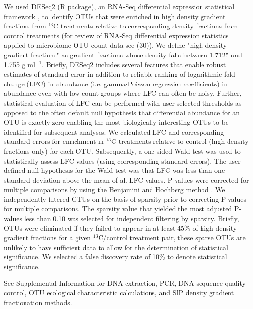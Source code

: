We used DESeq2 (R package), an RNA-Seq differential expression statistical
framework \citep{love2014}, to identify OTUs that were enriched in high
density gradient fractions from $^{13}$C-treatments relative to corresponding
density fractions from control treatments (for review of RNA-Seq differential
expression statistics applied to microbiome OTU count data see (30)). We define
"high density gradient fractions" as gradient fractions whose density falls
between 1.7125 and 1.755 g ml$^{-1}$. Briefly, DESeq2 includes several features that
enable robust estimates of standard error in addition to reliable ranking of
logarithmic fold change (LFC) in abundance (i.e. gamma-Poisson regression
coefficients) in abundance even with low count groups where LFC can often be
noisy. Further, statistical evaluation of LFC can be performed with
user-selected thresholds as opposed to the often default null hypothesis that
differential abundance for an OTU is exactly zero enabling the most
biologically interesting OTUs to be identified for subsequent analyses. We
calculated LFC and corresponding standard errors for enrichment in  $^{13}$C
treatments relative to control (high density fractions only) for each OTU.
Subsequently, a one-sided Wald test was used to statistically assess LFC values
(using corresponding standard errors). The user-defined null hypothesis for the
Wald test was that LFC was less than one standard deviation above the mean of
all LFC values. P-values were corrected for multiple comparisons by using the
Benjamini and Hochberg method \citep{benjamini1995}. We independently filtered
OTUs on the basis of sparsity prior to correcting P-values for multiple
comparisons. The sparsity value that yielded the most adjusted P-values less
than 0.10 was selected for independent filtering by sparsity. Briefly, OTUs
were eliminated if they failed to appear in at least 45\% of high density
gradient fractions for a given $^{13}$C/control treatment pair, these sparse
OTUs are unlikely to have sufficient data to allow for the determination of
statistical significance. We selected a false discovery rate of 10\% to denote
statistical significance.

See Supplemental Information for DNA extraction, PCR, DNA sequence quality
control, OTU ecological characteristic calculations, and SIP density gradient
fractionation methods.
